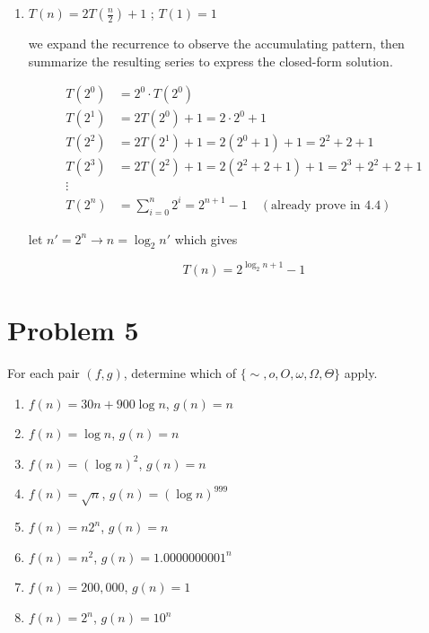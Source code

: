 \begin{enumerate}[label=\arabic*.]
    let $n' = 2^n \rightarrow n = \log_2 n'$ which gives

    \[
        \boxed{T(n) = (\log_2 n + 1)\left(2^{\log_2 n}\right)}
    \]

    \medskip
    \begin{center}
        \rule{0.3\linewidth}{0.2pt}
    \end{center}
    \medskip

    \item $T(n)=2T\left(\frac{n}{2}\right)+1$ ; $T(1)=1$

    we expand the recurrence to observe the accumulating pattern, then summarize the resulting series to express the closed-form solution.

    \[
    \begin{aligned}
        T(2^0) &= 2^0 \cdot T(2^0) \\
        T(2^1) &= 2T(2^0) + 1 = 2 \cdot 2^0 + 1 \\
        T(2^2) &= 2T(2^1) + 1 = 2(2^0 + 1) + 1 = 2^2 + 2 + 1 \\
        T(2^3) &= 2T(2^2) + 1 = 2(2^2 + 2 + 1) + 1 = 2^3 + 2^2 + 2 + 1 \\
        \vdots \\
        T(2^n) &= \sum_{i=0}^n 2^i = 2^{n+1} - 1 \quad (\text{already prove in 4.4})
    \end{aligned}
    \]

    let $n' = 2^n \rightarrow n = \log_2 n'$ which gives

    \[
        \boxed{T(n)=2^{\log_2 n + 1} - 1}
    \]
\end{enumerate}

\vspace{1em}
\hrulefill

\section*{Problem 5}
For each pair $(f,g)$, determine which of $\{\sim, o, O, \omega, \Omega, \Theta\}$ apply.
\begin{enumerate}[label=\arabic*.]
    \item $f(n) = 30n + 900\log n$, $g(n) = n$
    \item $f(n) = \log n$, $g(n) = n$
    \item $f(n) = (\log n)^2$, $g(n) = n$
    \item $f(n) = \sqrt{n}$, $g(n) = (\log n)^{999}$
    \item $f(n) = n2^n$, $g(n) = n$
    \item $f(n) = n^2$, $g(n) = 1.0000000001^n$
    \item $f(n) = 200{,}000$, $g(n) = 1$
    \item $f(n) = 2^n$, $g(n) = 10^n$
\end{enumerate}
\medskip
\solution

